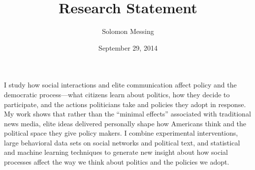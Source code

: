 \documentclass[12pt]{article}
\begin{document}
  
\title{Research Statement}
\author{Solomon Messing}
\date{September 29, 2014}
\maketitle 




%
%

I study how social interactions and elite communication affect policy and the democratic process---what citizens learn about politics, how they decide to participate, and the actions politicians take and policies they adopt in response.  My work shows that rather than the ``minimal effects'' associated with traditional news media, elite ideas delivered personally shape how Americans think and the political space they give policy makers.  I combine experimental interventions, large behavioral data sets on social networks and political text, and statistical and machine learning techniques to generate new insight about how social processes affect the way we think about politics and the policies we adopt.  %
\end{document}
